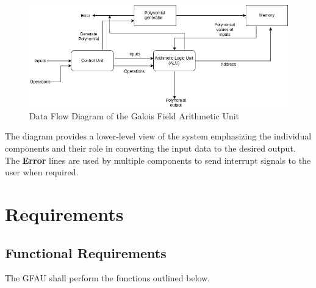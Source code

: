 \documentclass[12pt]{extarticle}
\newcommand{\team}{Galois Field Arithmetic Unit}
\begin{document}
        \begin{figure}[ht]
            \begin{center}
                \includegraphics[width=1\textwidth]{data_flow.png}
                \caption{Data Flow Diagram of the \team~} \label{fig:data_flow}
            \end{center}
        \end{figure}

        The diagram provides a lower-level view of the system emphasizing the
        individual components and their role in converting the input data to
        the desired output. The \textbf{Error} lines are used by multiple
        components to send interrupt signals to the user when required.
        \newpage

    \section{Requirements}

        \subsection{Functional Requirements} The GFAU shall perform the
        functions outlined below.
\end{document}
